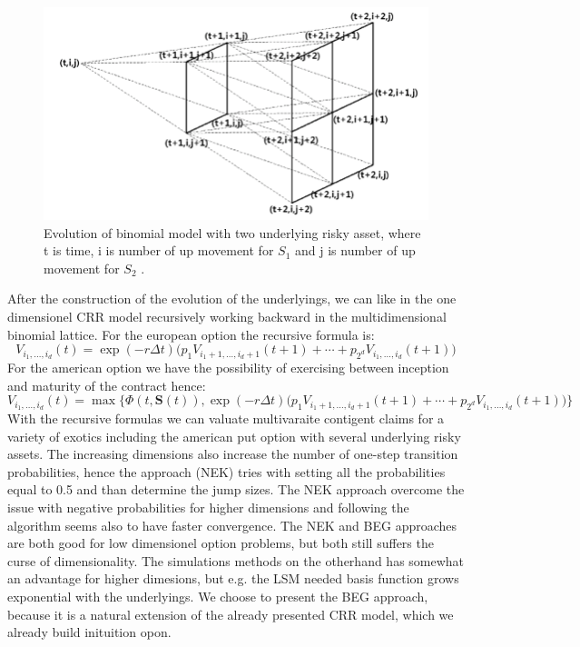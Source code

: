 \begin{figure}[H]
\centering
\includegraphics[width=\textwidth]{Figures/Three-dimensional-binomial-lattice.png}
\decoRule
\caption[Three Dimensionel Binomial Lattice]{Evolution of binomial model with two underlying risky asset, where t is time, i is number of up movement for $S_1$ and j is number of up movement for $S_2$  \parencite{Kim02}.}
\label{fig:threeDimLattice}
\end{figure}

After the construction of the evolution of the underlyings, we can like in the one dimensionel CRR model recursively working backward in the multidimensional binomial lattice. For the european option the recursive formula is:
$$V_{i_1,\ldots, i_d}(t)=\exp(-r\Delta t) \bigg(p_1 V_{i_1+1,\ldots, i_d +1}(t+1) + \cdots + p_{2^d} V_{i_1,\ldots, i_d}(t+1) \bigg)$$
For the american option we have the possibility of exercising between inception and maturity of the contract hence:
$$V_{i_1,\ldots, i_d}(t)=\max\{\Phi(t,\bm{S}(t)), \exp(-r\Delta t) \bigg(p_1 V_{i_1+1,\ldots, i_d +1}(t+1) + \cdots + p_{2^d} V_{i_1,\ldots, i_d}(t+1) \bigg)\}$$
With the recursive formulas we can valuate multivaraite contigent claims for a variety of exotics including the american put option with several underlying risky assets. The increasing dimensions also increase the number of one-step transition probabilities, hence the \parencite{NEK} approach (NEK) tries with setting all the probabilities equal to 0.5 and than determine the jump sizes. The NEK approach overcome the issue with negative probabilities for higher dimensions and following \parencite{NEK} the algorithm seems also to have faster convergence. The NEK and BEG approaches are both good for low dimensionel option problems, but both still suffers the curse of dimensionality. The simulations methods on the otherhand has somewhat an advantage for higher dimesions, but e.g. the LSM needed basis function grows exponential with the underlyings. We choose to present the BEG approach, because it is a natural extension of the already presented CRR model, which we already build inituition opon.\\

